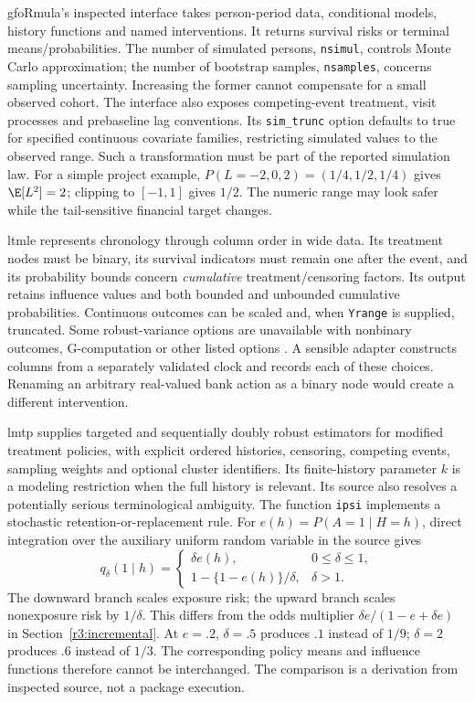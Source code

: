 gfoRmula's inspected interface takes person-period data, conditional models,
history functions and named interventions. It returns survival risks or
terminal means/probabilities. The number of simulated persons,
\texttt{nsimul}, controls Monte Carlo approximation; the number of
bootstrap samples, \texttt{nsamples}, concerns sampling uncertainty.
Increasing the former cannot compensate for a small observed cohort.
The interface also exposes competing-event treatment, visit processes and
prebaseline lag conventions. Its \texttt{sim\_trunc} option defaults to
true for specified continuous covariate families, restricting simulated
values to the observed range. Such a transformation must be part of the
reported simulation law. For a simple project example,
$P(L=-2,0,2)=(1/4,1/2,1/4)$ gives $\E[L^2]=2$; clipping to $[-1,1]$
gives $1/2$. The numeric range may look safer while the tail-sensitive
financial target changes.

ltmle represents chronology through column order in wide data. Its
treatment nodes must be binary, its survival indicators must remain one
after the event, and its probability bounds concern \emph{cumulative}
treatment/censoring factors. Its output retains influence values and
both bounded and unbounded cumulative probabilities. Continuous outcomes
can be scaled and, when \texttt{Yrange} is supplied, truncated. Some
robust-variance options are unavailable with nonbinary outcomes,
G-computation or other listed options \citep{sw_ltmle}. A sensible adapter
constructs columns from a separately validated clock and records each of
these choices. Renaming an arbitrary real-valued bank action as a binary
node would create a different intervention.

lmtp supplies targeted and sequentially doubly robust estimators for
modified treatment policies, with explicit ordered histories, censoring,
competing events, sampling weights and optional cluster identifiers.
Its finite-history parameter $k$ is a modeling restriction when the full
history is relevant. Its source also resolves a potentially serious
terminological ambiguity. The function \texttt{ipsi} implements a
stochastic retention-or-replacement rule. For
$e(h)=P(A=1\mid H=h)$, direct integration over the auxiliary uniform
random variable in the source gives
\begin{equation}
 q_\delta(1\mid h)=
 \begin{cases}
  \delta e(h),&0\leq\delta\leq1,\\
  1-\{1-e(h)\}/\delta,&\delta>1.
 \end{cases}
 \label{r3:software-ipsi}
\end{equation}
The downward branch scales exposure risk; the upward branch scales
nonexposure risk by $1/\delta$. This differs from the odds multiplier
$\delta e/(1-e+\delta e)$ in Section~\ref{r3:incremental}.
At $e=.2$, $\delta=.5$ produces $.1$ instead of $1/9$;
$\delta=2$ produces $.6$ instead of $1/3$. The corresponding policy means
and influence functions therefore cannot be interchanged. The comparison
is a derivation from inspected source, not a package execution.

